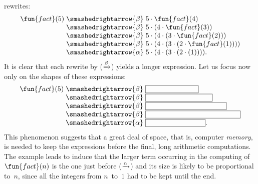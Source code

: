 rewrites:\label{trace:fact_5}
\begin{equation*}
\begin{array}{r@{\;}c@{\;}l}
\fun{fact}(5)
& \smashedrightarrow{\beta} & 5 \cdot \fun{fact}(4)\\
& \smashedrightarrow{\beta} & 5 \cdot (4 \cdot \fun{fact}(3))\\
& \smashedrightarrow{\beta} & 5 \cdot (4 \cdot (3 \cdot \fun{fact}(2)))\\
& \smashedrightarrow{\beta} & 5 \cdot (4 \cdot (3 \cdot (2 \cdot
                              \fun{fact}(1))))\\
& \smashedrightarrow{\alpha} & 5 \cdot (4 \cdot (3 \cdot (2 \cdot
(1)))).
\end{array}
\end{equation*}
It is clear that each rewrite by (\(\xrightarrow{\smash[t]{\beta}}\))
yields a longer expression. Let us focus now only on the shapes of
these expressions:
\begin{equation*}
\setlength\fboxsep{0mm}
\begin{array}{r@{\;}c@{\;}l}
\fun{fact}(5)
& \smashedrightarrow{\beta} & \fbox{\phantom{$5 \cdot \fun{fact}(4)$}}\\
& \smashedrightarrow{\beta} & \fbox{\phantom{$5 \cdot (4 \cdot \fun{fact}(3))$}}\\
& \smashedrightarrow{\beta} & \fbox{\phantom{$5 \cdot (4 \cdot (3 \cdot \fun{fact}(2)))$}}\\
& \smashedrightarrow{\beta} & \fbox{\phantom{$5 \cdot (4 \cdot (3 \cdot (2 \cdot \fun{fact}(1))))$}}\\
& \smashedrightarrow{\alpha} & \fbox{\phantom{$5 \cdot (4 \cdot (3
    \cdot (2 \cdot (1))))$}}.
\end{array}
\end{equation*}
This phenomenon suggests that a great deal of space, that is, computer
\emph{memory}, is needed to keep the expressions before the final,
long arithmetic computations. The example leads to induce that the
larger term occurring in the computing of \(\fun{fact}(n)\) is the one
just before (\(\xrightarrow{\smash[t]{\alpha}}\)) and its size is
likely to be proportional to~\(n\), since all the integers from
\(n\)~to~\(1\) had to be kept until the end.

